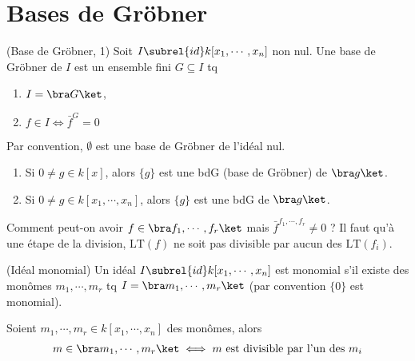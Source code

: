     \section{Bases de Gröbner}
        \begin{defi} (Base de Gröbner, 1)
            \label{grob_1}
            Soit $I \subrel{id} k[x_1, \cdots, x_n]$ non nul. Une base de Gröbner de $I$ est un ensemble fini $G \subseteq I$ tq
            \begin{enumerate}
                \item $I = \bra G \ket$,
                \item $f \in I \iff \bar f^G = 0$
            \end{enumerate}
        \end{defi}
        Par convention, $\emptyset$ est une base de Gröbner de l'idéal nul.
        \begin{expl}
            \begin{enumerate}
                \item Si $0 \neq g \in k[x]$, alors $\{g\}$ est une bdG (base de Gröbner) de $\bra g \ket$.
                \item Si $0 \neq g \in k[x_1, \cdots, x_n]$, alors $\{g\}$ est une bdG de $\bra g \ket$.
            \end{enumerate}
        \end{expl}
        Comment peut-on avoir $f \in \bra f_1, \cdots, f_r \ket$ mais $\bar f^{f_1, \cdots, f_r} \neq 0$ ? Il faut qu'à une étape de la division, $\mathrm{LT}(f)$ ne soit pas divisible par aucun des $\mathrm{LT}(f_i)$. 
        \begin{defi} (Idéal monomial)
            Un idéal $I \subrel{id} k[x_1, \cdots, x_n]$ est monomial s'il existe des monômes $m_1, \cdots, m_r$ tq $I = \bra m_1, \cdots, m_r \ket$ (par convention $\{0\}$ est monomial).
        \end{defi}
        \begin{prop}
            \label{prop131}
            Soient $m_1, \cdots, m_r \in k[x_1, \cdots, x_n]$ des monômes, alors 
            \begin{align*}
                m \in \bra m_1, \cdots, m_r \ket \iff m \text{ est divisible par l'un des } m_i
            \end{align*}
        \end{prop}
